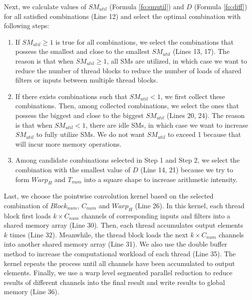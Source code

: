 Next, we calculate values of $SM_{util}$ (Formula \ref{fo:smutil}) and $D$ (Formula \ref{fo:diff}) for all satisfied combinations (Line 12) and select the optimal combination with following steps:
\begin{enumerate}[Step 1]
    \item If $SM_{util} \geq 1$ is true for all combinations, we select the combinations that possess the smallest and close to the smallest $SM_{util}$ (Lines 13, 17).
    The reason is that when $SM_{util} \geq 1$, all SMs are utilized, in which case we want to reduce the number of thread blocks to reduce the number of loads of shared filters or inputs between multiple thread blocks.
    \item If there exists combinations such that $SM_{util}<1$, we first collect these combinations. Then, among collected combinations, we select the ones that possess the biggest and close to the biggest $SM_{util}$ (Lines 20, 24).
    The reason is that when $SM_{util}<1$, there are idle SMs, in which case we want to increase $SM_{util}$ to fully utilize SMs. We do not want $SM_{util}$ to exceed 1 because that will incur more memory operations.
    \item Among candidate combinations selected in Step 1 and Step 2, we select the combination with the smallest value of $D$ (Line 14, 21) because we try to form $Warp_H$ and $T_{num}$ into a square shape to increase arithmetic intensity.
\end{enumerate}

Last, we choose the pointwise convolution kernel based on the selected combination of $Block_{num}$, $C_{num}$ and $Warp_H$ (Line 26).
In this kernel, each thread block first loads $k \times C_{num}$ channels of corresponding inputs and filters into a shared memory array (Line 30).
Then, each thread accumulates output elements $k$ times (Line 32).
Meanwhile, the thread block loads the next $k \times C_{num}$ channels into another shared memory array (Line 31).
We also use the double buffer method to increase the computational workload of each thread (Line 35).
The kernel repeats the process until all channels have been accumulated to output elements.
Finally, we use a warp level segmented parallel reduction to reduce results of different channels into the final result and write results to global memory (Line 36).
